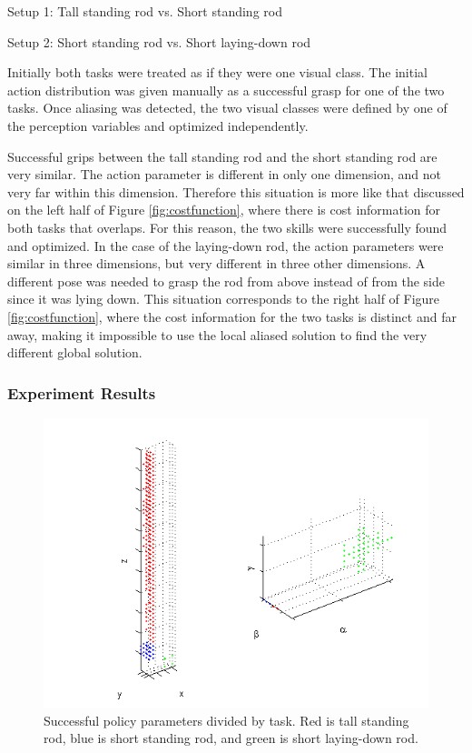 \documentclass[12pt]{article}
\begin{document}
Setup 1:	Tall standing rod	vs.	Short standing rod

Setup 2:	Short standing rod	vs. 	Short laying-down rod

	Initially both tasks were treated as if they were one visual class. The initial action distribution was given manually as a successful grasp for one of the two tasks. Once aliasing was detected, the two visual classes were defined by one of the perception variables and optimized independently.
	
Successful grips between the tall standing rod and the short standing rod are very similar. The action parameter is different in only one dimension, and not very far within this dimension. Therefore this situation is more like that discussed on the left half of Figure \ref{fig:costfunction}, where there is cost information for both tasks that overlaps. For this reason, the two skills were successfully found and optimized. In the case of the laying-down rod, the action parameters were similar in three dimensions, but very different in three other dimensions. A different pose was needed to grasp the rod from above instead of from the side since it was lying down. This situation corresponds to the right half of Figure \ref{fig:costfunction}, where the cost information for the two tasks is distinct and far away, making it impossible to use the local aliased solution to find the very different global solution.

\subsubsection{Experiment Results}

\begin{figure}[ht]
  \centerline{
  \includegraphics[width=0.9\columnwidth]{6d.png}}
  \caption{\label{fig_label} Successful policy parameters divided by task. Red is tall standing rod, blue is short standing rod, and green is short laying-down rod.}
  \label{fig:6d}
\end{figure}
\end{document}
